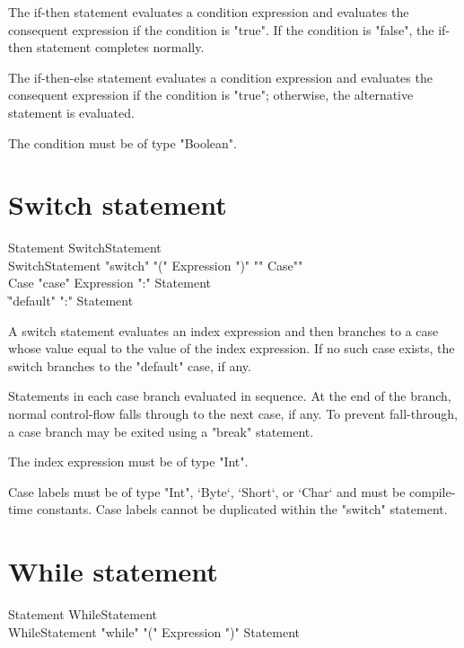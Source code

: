 The if-then statement evaluates a condition expression and 
evaluates the consequent expression if the condition is
\xcd"true".  If the 
condition is \xcd"false",
the if-then statement completes normally.

The if-then-else statement evaluates a condition expression and 
evaluates the consequent expression if the condition is
\xcd"true"; otherwise, the alternative statement is evaluated.

The condition must be of type \xcd"Boolean".

\section{Switch statement}

\begin{grammar}
Statement \: SwitchStatement \\
SwitchStatement \: \xcd"switch" \xcd"(" Expression \xcd")" \xcd"{" Case\plus \xcd"}" \\
Case \: \xcd"case" Expression \xcd":" Statement\star \\
     \| \xcd"default" \xcd":" Statement\star \\
\end{grammar}

A switch statement evaluates an index expression and then branches to
a case whose value equal to the value of the index expression.
If no such case exists, the switch branches to the 
\xcd"default" case, if any.

Statements in each case branch evaluated in sequence.  At the
end of the branch, normal control-flow falls through to the next case, if
any.  To prevent fall-through, a case branch may be exited using
a \xcd"break" statement.

The index expression must be of type \xcd"Int".

Case labels must be of type \xcd"Int", \xcd`Byte`, \xcd`Short`, or \xcd`Char`
and must be compile-time 
constants.  Case labels cannot be duplicated within the
\xcd"switch" statement.

\section{While statement}

\begin{grammar}
Statement \: WhileStatement \\
WhileStatement \: \xcd"while" \xcd"(" Expression \xcd")" Statement \\
\end{grammar}

